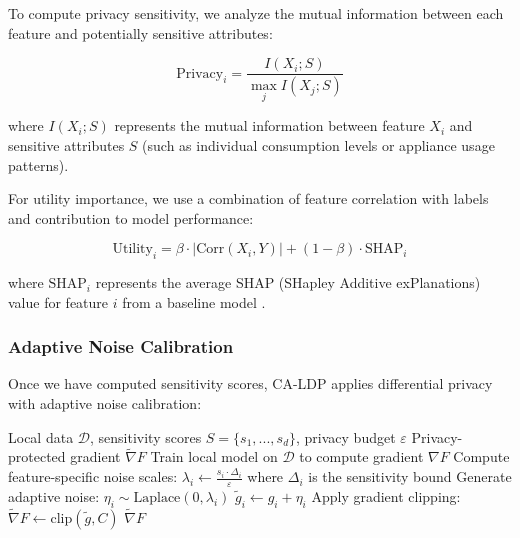 \documentclass{ieeeaccess}
\theoremstyle{definition}
\begin{document}
To compute privacy sensitivity, we analyze the mutual information between each feature and potentially sensitive attributes:

\begin{equation}
\text{Privacy}_i = \frac{I(X_i; S)}{\max_j I(X_j; S)}
\end{equation}

where $I(X_i; S)$ represents the mutual information between feature $X_i$ and sensitive attributes $S$ (such as individual consumption levels or appliance usage patterns).

For utility importance, we use a combination of feature correlation with labels and contribution to model performance:

\begin{equation}
\text{Utility}_i = \beta \cdot |\text{Corr}(X_i, Y)| + (1-\beta) \cdot \text{SHAP}_i
\end{equation}

where $\text{SHAP}_i$ represents the average SHAP (SHapley Additive exPlanations) value for feature $i$ from a baseline model \cite{lundberg2017shap, lv2022review, ali2024enhancing}.

\subsubsection{Adaptive Noise Calibration}

Once we have computed sensitivity scores, CA-LDP applies differential privacy with adaptive noise calibration:

\begin{algorithm}
\caption{Context-Aware Local Differential Privacy}
\label{alg:ca_ldp}
\begin{algorithmic}[1]
\REQUIRE Local data $\mathcal{D}$, sensitivity scores $S = \{s_1, ..., s_d\}$, privacy budget $\varepsilon$
\ENSURE Privacy-protected gradient $\tilde{\nabla}F$
\STATE Train local model on $\mathcal{D}$ to compute gradient $\nabla F$
\STATE Compute feature-specific noise scales:
    \STATE $\lambda_i \leftarrow \frac{s_i \cdot \Delta_i}{\varepsilon}$ where $\Delta_i$ is the sensitivity bound
\ENDFOR
\STATE Generate adaptive noise:
    \STATE $\eta_i \sim \text{Laplace}(0, \lambda_i)$
    \STATE $\tilde{g}_i \leftarrow g_i + \eta_i$
\ENDFOR
\STATE Apply gradient clipping: $\tilde{\nabla}F \leftarrow \text{clip}(\tilde{g}, C)$
\RETURN $\tilde{\nabla}F$
\end{algorithmic}
\end{algorithm}
\end{document}
